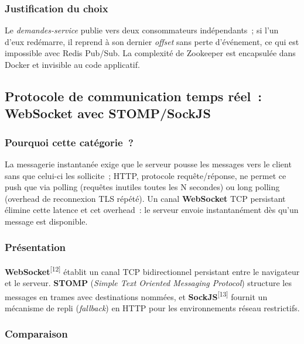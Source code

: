 \subsubsection*{Justification du choix}

Le \textit{demandes-service} publie vers deux consommateurs indépendants~; si l'un d'eux redémarre, il reprend à son dernier \textit{offset} sans perte d'événement, ce qui est impossible avec Redis Pub/Sub. La complexité de Zookeeper est encapsulée dans Docker et invisible au code applicatif.

\subsection{Protocole de communication temps réel~: WebSocket avec STOMP/SockJS}

\subsubsection*{Pourquoi cette catégorie~?}

La messagerie instantanée exige que le serveur pousse les messages vers le client sans que celui-ci les sollicite~; HTTP, protocole requête/réponse, ne permet ce push que via polling (requêtes inutiles toutes les N secondes) ou long polling (overhead de reconnexion TLS répété). Un canal \textbf{WebSocket} TCP persistant élimine cette latence et cet overhead~: le serveur envoie instantanément dès qu'un message est disponible.

\subsubsection*{Présentation}

\textbf{WebSocket}\textsuperscript{[12]} établit un canal TCP bidirectionnel persistant entre le navigateur
et le serveur. \textbf{STOMP} (\textit{Simple Text Oriented Messaging Protocol})
structure les messages en trames avec destinations nommées, et \textbf{SockJS}\textsuperscript{[13]}
fournit un mécanisme de repli (\textit{fallback}) en HTTP pour les environnements
réseau restrictifs.

\subsubsection*{Comparaison}

